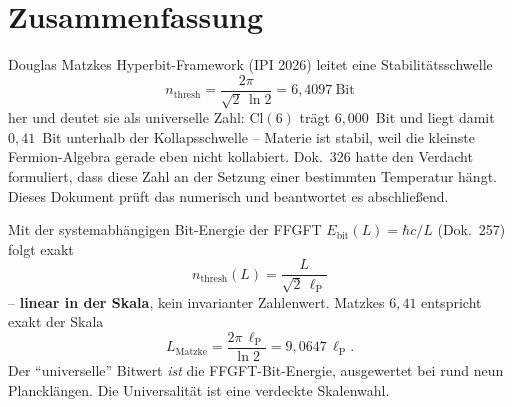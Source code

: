 
\providecommand{\K}{}\renewcommand{\K}{\textbf{[K]}}
\providecommand{\B}{}\renewcommand{\B}{\textbf{[B]}}
\renewcommand{\S}{\textbf{[S]}}
\providecommand{\X}{}\renewcommand{\X}{\textbf{[X]}}
\providecommand{\lP}{}\renewcommand{\lP}{\ell_{\mathrm{P}}}
\providecommand{\mP}{}\renewcommand{\mP}{m_{\mathrm{P}}}
\providecommand{\TP}{}\renewcommand{\TP}{T_{\mathrm{P}}}
\providecommand{\Ebit}{}\renewcommand{\Ebit}{E_{\mathrm{bit}}}
\providecommand{\mbit}{}\renewcommand{\mbit}{m_{\mathrm{bit}}}
\providecommand{\nthr}{}\renewcommand{\nthr}{n_{\mathrm{thresh}}}
\providecommand{\Mcoll}{}\renewcommand{\Mcoll}{M_{\mathrm{coll}}}


\section*{Zusammenfassung}

Douglas Matzkes Hyperbit-Framework (IPI 2026) leitet eine
Stabilitätsschwelle
\begin{equation}
  \nthr = \frac{2\pi}{\sqrt{2}\,\ln 2} = 6{,}4097~\text{Bit}
\end{equation}
her und deutet sie als universelle Zahl: $\mathrm{Cl}(6)$ trägt
$6{,}000$~Bit und liegt damit $0{,}41$~Bit unterhalb der Kollapsschwelle --
Materie ist stabil, weil die kleinste Fermion-Algebra gerade eben nicht
kollabiert. Dok.~326 hatte den Verdacht formuliert, dass diese Zahl an
der Setzung einer bestimmten Temperatur hängt. Dieses Dokument prüft das
numerisch und beantwortet es abschließend.

\begin{tcolorbox}[ffgftbox, title={Hauptresultat \B}]
  Mit der systemabhängigen Bit-Energie der FFGFT
  $\Ebit(L) = \hbar c/L$ (Dok.~257) folgt exakt
  \begin{equation}
    \nthr(L) = \frac{L}{\sqrt{2}\,\lP}
    \label{eq:main}
  \end{equation}
  -- \textbf{linear in der Skala}, kein invarianter Zahlenwert.
  Matzkes $6{,}41$ entspricht exakt der Skala
  \begin{equation}
    L_{\mathrm{Matzke}} = \frac{2\pi\,\lP}{\ln 2} = 9{,}0647\,\lP .
  \end{equation}
  Der \enquote{universelle} Bitwert \emph{ist} die FFGFT-Bit-Energie,
  ausgewertet bei rund neun Plancklängen.
  Die Universalität ist eine verdeckte Skalenwahl.
\end{tcolorbox}

